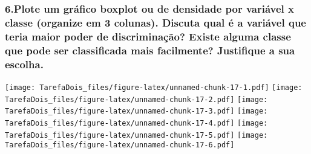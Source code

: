 \documentclass[
]{article}
\newenvironment{Shaded}{\begin{snugshade}}{\end{snugshade}}
\newcommand{\AttributeTok}[1]{\textcolor[rgb]{0.77,0.63,0.00}{#1}}
\newcommand{\ControlFlowTok}[1]{\textcolor[rgb]{0.13,0.29,0.53}{\textbf{#1}}}
\newcommand{\DecValTok}[1]{\textcolor[rgb]{0.00,0.00,0.81}{#1}}
\newcommand{\FunctionTok}[1]{\textcolor[rgb]{0.00,0.00,0.00}{#1}}
\newcommand{\NormalTok}[1]{#1}
\newcommand{\OtherTok}[1]{\textcolor[rgb]{0.56,0.35,0.01}{#1}}
\newcommand{\SpecialCharTok}[1]{\textcolor[rgb]{0.00,0.00,0.00}{#1}}
\newcommand{\StringTok}[1]{\textcolor[rgb]{0.31,0.60,0.02}{#1}}
\begin{document}
\hypertarget{plote-um-gruxe1fico-boxplot-ou-de-densidade-por-variuxe1vel-x-classe-organize-em-3-colunas.-discuta-qual-uxe9-a-variuxe1vel-que-teria-maior-poder-de-discriminauxe7uxe3o-existe-alguma-classe-que-pode-ser-classificada-mais-facilmente-justifique-a-sua-escolha.}{%
\subsubsection{6.Plote um gráfico boxplot ou de densidade por variável x
classe (organize em 3 colunas). Discuta qual é a variável que teria
maior poder de discriminação? Existe alguma classe que pode ser
classificada mais facilmente? Justifique a sua
escolha.}\label{plote-um-gruxe1fico-boxplot-ou-de-densidade-por-variuxe1vel-x-classe-organize-em-3-colunas.-discuta-qual-uxe9-a-variuxe1vel-que-teria-maior-poder-de-discriminauxe7uxe3o-existe-alguma-classe-que-pode-ser-classificada-mais-facilmente-justifique-a-sua-escolha.}}

\begin{Shaded}
\end{Shaded}

\texttt{[image: TarefaDois\_files/figure-latex/unnamed-chunk-17-1.pdf]}
\texttt{[image: TarefaDois\_files/figure-latex/unnamed-chunk-17-2.pdf]}
\texttt{[image: TarefaDois\_files/figure-latex/unnamed-chunk-17-3.pdf]}
\texttt{[image: TarefaDois\_files/figure-latex/unnamed-chunk-17-4.pdf]}
\texttt{[image: TarefaDois\_files/figure-latex/unnamed-chunk-17-5.pdf]}
\texttt{[image: TarefaDois\_files/figure-latex/unnamed-chunk-17-6.pdf]}
\end{document}
